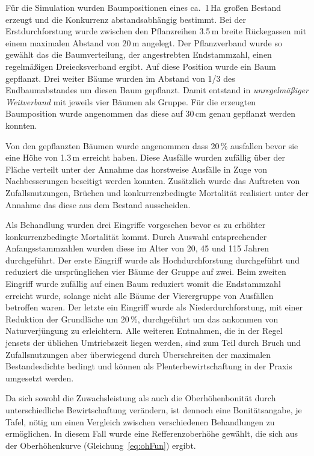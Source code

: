 \documentclass[twocolumn]{scrartcl}
\begin{document}
Für die Simulation wurden Baumpositionen eines ca.\ 1\,Ha großen
Bestand erzeugt und die Konkurrenz abstandsabhängig bestimmt. Bei der
Erstdurchforstung wurde zwischen den Pflanzreihen 3.5\,m breite
Rückegassen mit einem maximalen Abstand von 20\,m angelegt. Der
Pflanzverband wurde so gewählt das die Baumverteilung, der
angestrebten Endstammzahl, einen regelmäßigen Dreiecksverband
ergibt. Auf diese Position wurde ein Baum gepflanzt. Drei weiter Bäume
wurden im Abstand von 1/3 des Endbaumabstandes um diesen Baum
gepflanzt. Damit entstand in \emph{unregelmäßiger Weitverband} mit
jeweils vier Bäumen als Gruppe. Für die erzeugten Baumposition wurde
angenommen das diese auf 30\,cm genau gepflanzt werden konnten.

Von den gepflanzten Bäumen wurde angenommen dass 20\,\% ausfallen
bevor sie eine Höhe von 1.3\,m erreicht haben. Diese Ausfälle wurden
zufällig über der Fläche verteilt unter der Annahme das horstweise
Ausfälle in Zuge von Nachbesserungen beseitigt werden
konnten. Zusätzlich wurde das Auftreten von Zufallsnutzungen, Brüchen
und konkurrenzbedingte Mortalität realisiert unter der Annahme das
diese aus dem Bestand ausscheiden.

Als Behandlung wurden drei Eingriffe vorgesehen bevor es zu erhöhter
konkurrenzbedingte Mortalität kommt. Durch Auswahl entsprechender
Anfangsstammzahlen wurden diese im Alter von 20, 45 und 115 Jahren
durchgeführt. Der erste Eingriff wurde als Hochdurchforstung
durchgeführt und reduziert die ursprünglichen vier Bäume der Gruppe
auf zwei. Beim zweiten Eingriff wurde zufällig auf einen Baum
reduziert womit die Endstammzahl erreicht wurde, solange nicht alle
Bäume der Vierergruppe von Ausfällen betroffen waren. Der letzte ein
Eingriff wurde als Niederdurchforstung, mit einer Reduktion der
Grundläche um 20\,\%, durchgeführt um das ankommen von Naturverjüngung
zu erleichtern. Alle weiteren Entnahmen, die in der Regel jensets der
üblichen Umtriebszeit liegen werden, sind zum Teil durch Bruch und
Zufallsnutzungen aber überwiegend durch Überschreiten der maximalen
Bestandesdichte bedingt und können als Plenterbewirtschaftung in der
Praxis umgesetzt werden.

Da sich sowohl die Zuwachsleistung als auch die Oberhöhenbonität durch
unterschiedliche Bewirtschaftung verändern, ist dennoch eine
Bonitätsangabe, je Tafel, nötig um einen Vergleich zwischen
verschiedenen Behandlungen zu ermöglichen. In diesem Fall wurde eine
Refferenzoberhöhe gewählt, die sich aus der Oberhöhenkurve
(Gleichung~\ref{eq:ohFun}) ergibt.
\end{document}
